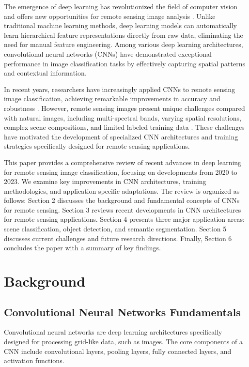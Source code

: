 \documentclass[12pt,a4paper]{article}
\begin{document}
The emergence of deep learning has revolutionized the field of computer vision and offers new opportunities for remote sensing image analysis \cite{zhu2017deep}. Unlike traditional machine learning methods, deep learning models can automatically learn hierarchical feature representations directly from raw data, eliminating the need for manual feature engineering. Among various deep learning architectures, convolutional neural networks (CNNs) have demonstrated exceptional performance in image classification tasks by effectively capturing spatial patterns and contextual information.

In recent years, researchers have increasingly applied CNNs to remote sensing image classification, achieving remarkable improvements in accuracy and robustness \cite{liu2019learning}. However, remote sensing images present unique challenges compared with natural images, including multi-spectral bands, varying spatial resolutions, complex scene compositions, and limited labeled training data \cite{cheng2016survey}. These challenges have motivated the development of specialized CNN architectures and training strategies specifically designed for remote sensing applications.

This paper provides a comprehensive review of recent advances in deep learning for remote sensing image classification, focusing on developments from 2020 to 2023. We examine key improvements in CNN architectures, training methodologies, and application-specific adaptations. The review is organized as follows: Section 2 discusses the background and fundamental concepts of CNNs for remote sensing. Section 3 reviews recent developments in CNN architectures for remote sensing applications. Section 4 presents three major application areas: scene classification, object detection, and semantic segmentation. Section 5 discusses current challenges and future research directions. Finally, Section 6 concludes the paper with a summary of key findings.

\section{Background}
\label{sec:background}

\subsection{Convolutional Neural Networks Fundamentals}
Convolutional neural networks are deep learning architectures specifically designed for processing grid-like data, such as images. The core components of a CNN include convolutional layers, pooling layers, fully connected layers, and activation functions. 
\end{document}
